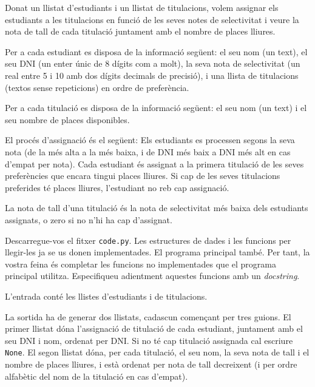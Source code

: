 

\Statement


Donat un llistat d'estudiants i un llistat de titulacions, volem assignar els estudiants a les titulacions en funció de les seves notes de selectivitat i veure la nota de tall de cada titulació juntament amb el nombre de places lliures.

\medskip

Per a cada estudiant es disposa de la informació següent: el seu nom (un text), el seu DNI (un enter únic de 8 dígits com a molt), la seva nota de selectivitat (un real entre 5 i 10 amb dos dígits decimals de precisió), i una llista de titulacions (textos sense repeticions) en ordre de preferència.

\medskip

Per a cada titulació es disposa de la informació següent: el seu nom (un text) i el seu nombre de places disponibles.

\medskip

El procés d'assignació és el següent: Els estudiants es processen segons la seva nota (de la més alta a la més baixa, i de DNI més baix a DNI més alt en cas d'empat per nota). Cada estudiant és assignat a la primera titulació de les seves preferències que encara tingui places lliures. Si cap de les seves titulacions preferides té places lliures, l'estudiant no reb cap assignació.

\medskip

La nota de tall d'una titulació és la nota de selectivitat més baixa dels estudiants assignats, o zero si no n'hi ha cap d'assignat.

\medskip

Descarregue-vos el fitxer \texttt{code.py}. Les estructures de dades i les funcions per llegir-les ja se us donen implementades. El programa principal també. Per tant, la vostra feina és completar les funcions no implementades que el programa principal utilitza. Especifiqueu adientment aquestes funcions amb un \emph{docstring}.

\Input

L'entrada conté les llistes d'estudiants i de titulacions.

\Output

La sortida ha de generar dos llistats, cadascun començant per tres guions. El primer llistat dóna l'assignació de titulació de cada estudiant, juntament amb el seu DNI i nom, ordenat per DNI. Si no té cap titulació assignada cal escriure \texttt{None}. El segon llistat dóna, per cada titulació, el seu nom, la seva nota de tall i el nombre de places lliures, i està ordenat per nota de tall decreixent (i per ordre alfabètic del nom de la titulació en cas d'empat).


\Sample

